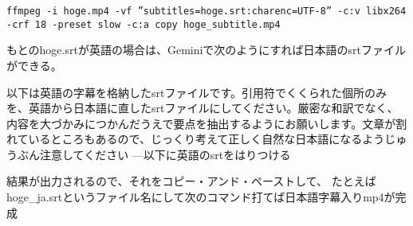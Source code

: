 \documentclass[12pt,jafontscale=0.9247]{jlreq}
\begin{document}
\begin{verbatim}
ffmpeg -i hoge.mp4 -vf ”subtitles=hoge.srt:charenc=UTF-8” -c:v libx264 -crf 18 -preset slow -c:a copy hoge_subtitle.mp4
\end{verbatim}

\bigskip

もとのhoge.srtが英語の場合は、Geminiで次のようにすれば日本語のsrtファイルができる。
\begin{tcolorbox}
 以下は英語の字幕を格納したsrtファイルです。引用符でくくられた個所のみを、英語から日本語に直したsrtファイルにしてください。厳密な和訳でなく、内容を大づかみにつかんだうえで要点を抽出するようにお願いします。文章が割れているところもあるので、じっくり考えて正しく自然な日本語になるようじゅうぶん注意してください
---以下に英語のsrtをはりつける
\end{tcolorbox}

結果が出力されるので、それをコピー・アンド・ペーストして、
たとえばhoge\_ja.srtというファイル名にして次のコマンド打てば日本語字幕入りmp4が完成
\end{document}
